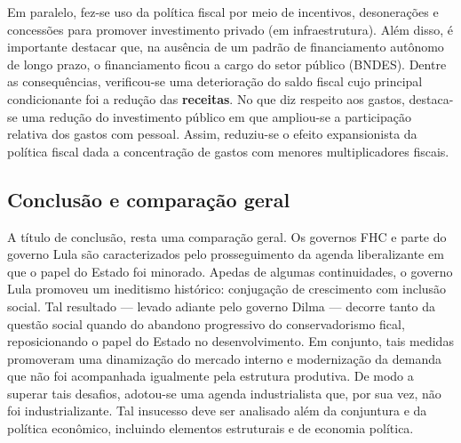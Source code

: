 \documentclass[11pt]{article}
\begin{document}
Em paralelo, fez-se uso da política fiscal por meio de incentivos, desonerações e concessões para promover investimento privado (em infraestrutura).
Além disso, é importante destacar que, na ausência de um padrão de financiamento autônomo de longo prazo, o financiamento ficou a cargo do setor público (BNDES).
Dentre as consequências, verificou-se uma deterioração do saldo fiscal cujo principal condicionante foi a redução das \textbf{receitas}.
No que diz respeito aos gastos, destaca-se uma redução do investimento público em que ampliou-se a participação relativa dos gastos com pessoal.
Assim, reduziu-se o efeito expansionista da política fiscal dada a concentração de gastos com menores multiplicadores fiscais.
\subsection*{Conclusão e comparação geral}
\label{sec:orge4a7512}
A título de conclusão, resta uma comparação geral.
Os governos FHC e parte do governo Lula são caracterizados pelo prosseguimento da agenda liberalizante em que o papel do Estado foi minorado.
Apedas de algumas continuidades, o governo Lula promoveu um ineditismo histórico: conjugação de crescimento com inclusão social.
Tal resultado --- levado adiante pelo governo Dilma --- decorre tanto da questão social quando do abandono progressivo do conservadorismo fical, reposicionando o papel do Estado no desenvolvimento.
Em conjunto, tais medidas promoveram uma dinamização do mercado interno e modernização da demanda que não foi acompanhada igualmente pela estrutura produtiva.
De modo a superar tais desafios, adotou-se uma agenda industrialista que, por sua vez, não foi industrializante.
Tal insucesso deve ser analisado além da conjuntura e da política econômico, incluindo elementos estruturais e de economia política.
\end{document}
